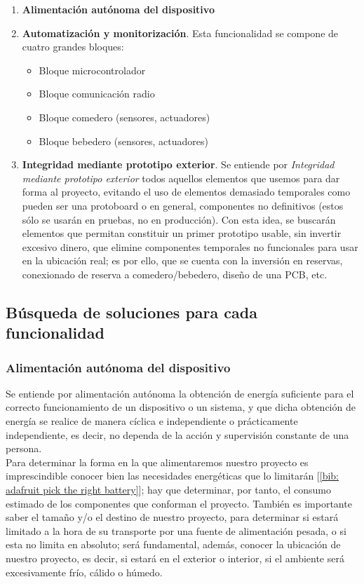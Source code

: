 \documentclass[12pt]{article}
\begin{document}
	\begin{enumerate}
		\item \textbf{Alimentación autónoma del dispositivo}
		\item \textbf{Automatización y monitorización}. Esta funcionalidad se compone de cuatro grandes bloques:
		\begin{itemize}
			\item Bloque microcontrolador
			\item Bloque comunicación radio 
			\item Bloque comedero (sensores, actuadores)
			\item Bloque bebedero (sensores, actuadores)
		\end{itemize}
	
		\item \textbf{Integridad mediante prototipo exterior}. Se entiende por \textit{Integridad mediante prototipo exterior} todos aquellos elementos que usemos para dar forma al proyecto, evitando el uso de elementos demasiado temporales como pueden ser una protoboard o en general, componentes no definitivos (estos sólo se usarán en pruebas, no en producción). Con esta  idea, se buscarán elementos que permitan constituir un primer prototipo usable, sin invertir excesivo dinero, que elimine componentes temporales no funcionales para usar en la ubicación real; es por ello, que se cuenta con la inversión en reservas, conexionado de reserva a comedero/bebedero, diseño de una PCB, etc.
	\end{enumerate}
	
	\subsection[Búsqueda soluciones]{Búsqueda de soluciones para cada funcionalidad}

	\subsubsection{Alimentación autónoma del dispositivo}
	\label{subseccion 3.2.1: búsqueda soluciones alimentación}
	\noindent Se entiende por alimentación autónoma la obtención de energía suficiente para el correcto funcionamiento de un dispositivo o un sistema, y que dicha obtención de energía se realice de manera cíclica e independiente o prácticamente independiente, es decir, no dependa de la acción y supervisión constante de una persona. \\
	
	\noindent Para determinar la forma en la que alimentaremos nuestro proyecto es imprescindible conocer bien las necesidades energéticas que lo limitarán [\ref{bib: adafruit pick the right battery}]; hay que determinar, por tanto, el consumo estimado de los componentes que conforman el proyecto. También es importante saber el tamaño y/o el destino de nuestro proyecto, para determinar si estará limitado a la hora de su transporte por una fuente de alimentación pesada, o si esta no limita en absoluto; será fundamental, además, conocer la ubicación de nuestro proyecto, es decir, si estará en el exterior o interior, si el ambiente será excesivamente frío, cálido o húmedo.\\
	
\end{document}
